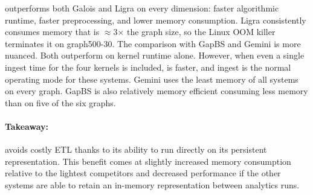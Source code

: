 \project{} outperforms both Galois and Ligra on every dimension: faster algorithmic runtime, faster preprocessing, and lower memory consumption.
Ligra consistently consumes memory that is $\approx$3$\times$ the graph size, so the Linux OOM killer terminates it on graph500-30.
The comparison with GapBS and Gemini is more nuanced.
Both outperform \project{} on kernel runtime alone. However, when even a single ingest time for the four kernels is included, \project{} is faster, and ingest is the normal operating mode for these systems.
Gemini uses the least memory of all systems on every graph.
GapBS is also relatively memory efficient consuming less memory than \project{} on five of the six graphs.

\paragraph{Takeaway:} \project{} avoids costly ETL thanks to its ability to run directly on its persistent representation.
This benefit comes at slightly increased memory consumption relative to the lightest competitors and decreased performance if the other systems are able to retain an in-memory representation between analytics runs.